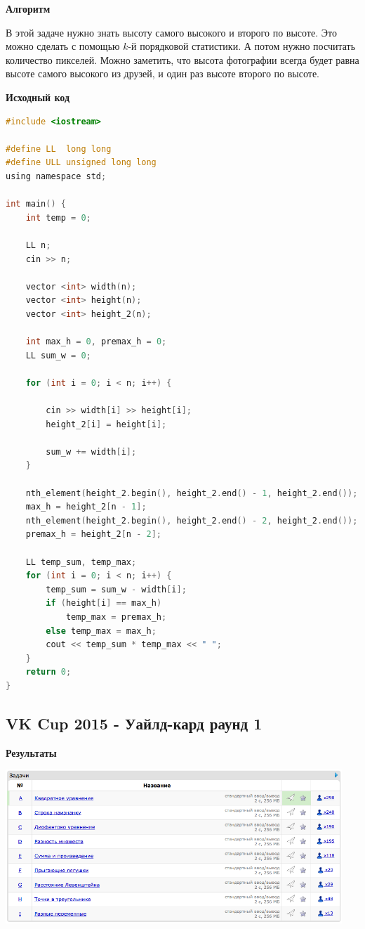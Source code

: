 \documentclass[a4paper,12pt]{article}
\begin{document}
\textbf{{\large Алгоритм}}

В этой задаче нужно знать высоту самого высокого и второго по высоте. Это можно сделать с помощью $k$-й порядковой статистики. А потом нужно посчитать количество пикселей. Можно заметить, что высота фотографии всегда будет равна высоте самого высокого из друзей, и один раз высоте второго по высоте.

\newpage
\textbf{{\large Исходный код}} \\
\begin{lstlisting}[language=C]
#include <iostream>

#define LL  long long
#define ULL unsigned long long
using namespace std;

int main() {
	int temp = 0;

	LL n;
	cin >> n;

	vector <int> width(n);
	vector <int> height(n);
	vector <int> height_2(n);

	int max_h = 0, premax_h = 0;
	LL sum_w = 0;

	for (int i = 0; i < n; i++) {

		cin >> width[i] >> height[i];
		height_2[i] = height[i];

		sum_w += width[i];
	}

	nth_element(height_2.begin(), height_2.end() - 1, height_2.end());
	max_h = height_2[n - 1];
	nth_element(height_2.begin(), height_2.end() - 2, height_2.end());
	premax_h = height_2[n - 2];

	LL temp_sum, temp_max;
	for (int i = 0; i < n; i++) {
		temp_sum = sum_w - width[i];
		if (height[i] == max_h)
			temp_max = premax_h;
		else temp_max = max_h;
		cout << temp_sum * temp_max << " ";
	}
	return 0;
}
\end{lstlisting}






%
%

\newpage
\subsection{ VK Cup 2015 - Уайлд-кард раунд 1}

\textbf{{\large Результаты}} \\
\begin{center}
\includegraphics[width=0.95\textwidth]{VK_1/VK_1_result.png}\\ [1cm]
\end{center}
\end{document}
